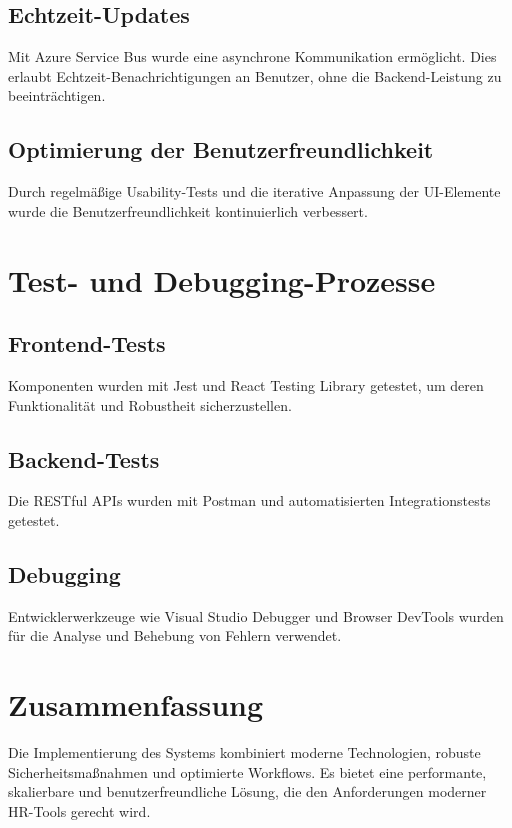 \subsection{Echtzeit-Updates}
Mit Azure Service Bus wurde eine asynchrone Kommunikation ermöglicht. Dies erlaubt Echtzeit-Benachrichtigungen an Benutzer, ohne die Backend-Leistung zu beeinträchtigen.

\subsection{Optimierung der Benutzerfreundlichkeit}
Durch regelmäßige Usability-Tests und die iterative Anpassung der UI-Elemente wurde die Benutzerfreundlichkeit kontinuierlich verbessert.

\section{Test- und Debugging-Prozesse}
\subsection{Frontend-Tests}
Komponenten wurden mit Jest und React Testing Library getestet, um deren Funktionalität und Robustheit sicherzustellen.

\subsection{Backend-Tests}
Die RESTful APIs wurden mit Postman und automatisierten Integrationstests getestet.

\subsection{Debugging}
Entwicklerwerkzeuge wie Visual Studio Debugger und Browser DevTools wurden für die Analyse und Behebung von Fehlern verwendet.

\section{Zusammenfassung}
Die Implementierung des Systems kombiniert moderne Technologien, robuste Sicherheitsmaßnahmen und optimierte Workflows. Es bietet eine performante, skalierbare und benutzerfreundliche Lösung, die den Anforderungen moderner HR-Tools gerecht wird.
